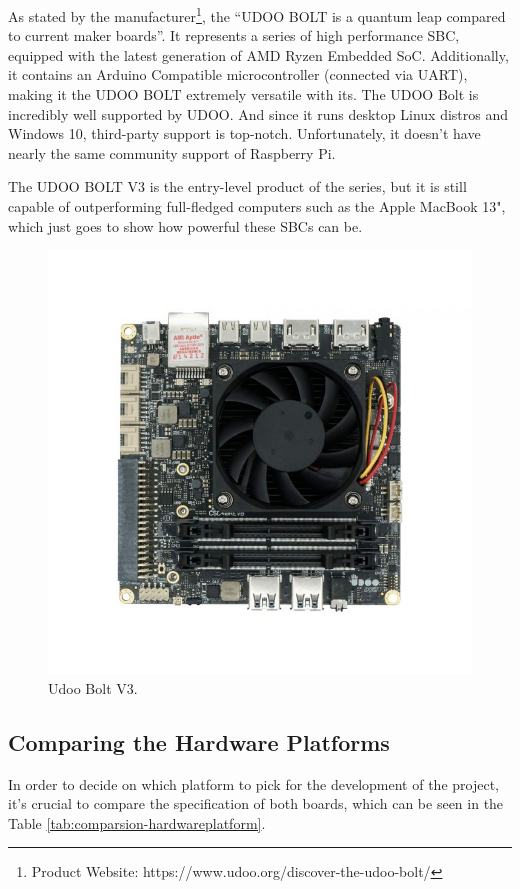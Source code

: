 As stated by the manufacturer\footnote{Product Website: https://www.udoo.org/discover-the-udoo-bolt/}, the ``UDOO BOLT is a quantum leap compared to current maker boards''. It represents a series of high performance \acs{SBC}, equipped with the latest generation of AMD Ryzen Embedded SoC. Additionally, it contains an Arduino Compatible microcontroller (connected via UART), making it the UDOO BOLT extremely versatile with its.
The UDOO Bolt is incredibly well supported by UDOO. And since it runs desktop Linux distros and Windows 10, third-party support is top-notch. Unfortunately, it doesn't have nearly the same community support of Raspberry Pi.

The UDOO BOLT V3 is the entry-level product of the series, but it is still capable of outperforming full-fledged computers such as the Apple MacBook 13", which just goes to show how powerful these \acs{SBC}s can be.

\begin{figure}[H]
    \centering
    \includegraphics[width=0.45\linewidth]{images/udoobolt-image.jpg}
    \caption{Udoo Bolt V3.}
    \label{fig:udoobolt-image}
\end{figure}

\subsection{Comparing the Hardware Platforms}

In order to decide on which platform to pick for the development of the project, it's crucial to compare the specification of both boards, which can be seen in the Table \ref{tab:comparsion-hardwareplatform}.

